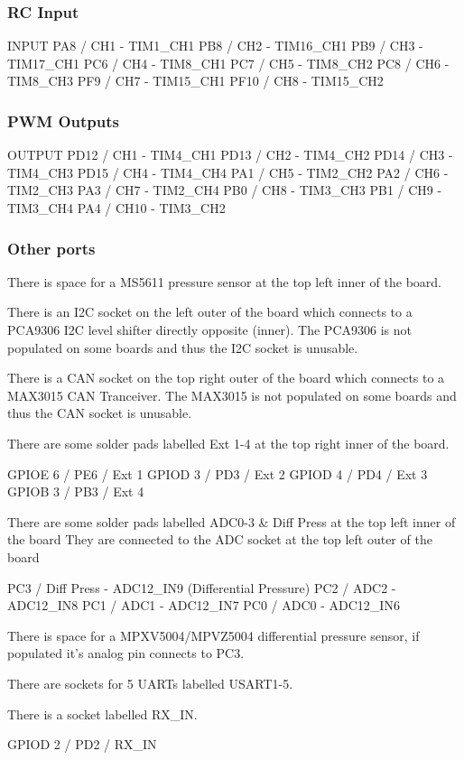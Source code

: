 \subsubsection*{R\+C Input}

I\+N\+P\+U\+T P\+A8 / C\+H1 -\/ T\+I\+M1\+\_\+\+C\+H1 P\+B8 / C\+H2 -\/ T\+I\+M16\+\_\+\+C\+H1 P\+B9 / C\+H3 -\/ T\+I\+M17\+\_\+\+C\+H1 P\+C6 / C\+H4 -\/ T\+I\+M8\+\_\+\+C\+H1 P\+C7 / C\+H5 -\/ T\+I\+M8\+\_\+\+C\+H2 P\+C8 / C\+H6 -\/ T\+I\+M8\+\_\+\+C\+H3 P\+F9 / C\+H7 -\/ T\+I\+M15\+\_\+\+C\+H1 P\+F10 / C\+H8 -\/ T\+I\+M15\+\_\+\+C\+H2

\subsubsection*{P\+W\+M Outputs}

O\+U\+T\+P\+U\+T P\+D12 / C\+H1 -\/ T\+I\+M4\+\_\+\+C\+H1 P\+D13 / C\+H2 -\/ T\+I\+M4\+\_\+\+C\+H2 P\+D14 / C\+H3 -\/ T\+I\+M4\+\_\+\+C\+H3 P\+D15 / C\+H4 -\/ T\+I\+M4\+\_\+\+C\+H4 P\+A1 / C\+H5 -\/ T\+I\+M2\+\_\+\+C\+H2 P\+A2 / C\+H6 -\/ T\+I\+M2\+\_\+\+C\+H3 P\+A3 / C\+H7 -\/ T\+I\+M2\+\_\+\+C\+H4 P\+B0 / C\+H8 -\/ T\+I\+M3\+\_\+\+C\+H3 P\+B1 / C\+H9 -\/ T\+I\+M3\+\_\+\+C\+H4 P\+A4 / C\+H10 -\/ T\+I\+M3\+\_\+\+C\+H2

\subsubsection*{Other ports}

There is space for a M\+S5611 pressure sensor at the top left inner of the board.

There is an I2\+C socket on the left outer of the board which connects to a P\+C\+A9306 I2\+C level shifter directly opposite (inner). The P\+C\+A9306 is not populated on some boards and thus the I2\+C socket is unusable.

There is a C\+A\+N socket on the top right outer of the board which connects to a M\+A\+X3015 C\+A\+N Tranceiver. The M\+A\+X3015 is not populated on some boards and thus the C\+A\+N socket is unusable.

There are some solder pads labelled Ext 1-\/4 at the top right inner of the board.

G\+P\+I\+O\+E 6 / P\+E6 / Ext 1 G\+P\+I\+O\+D 3 / P\+D3 / Ext 2 G\+P\+I\+O\+D 4 / P\+D4 / Ext 3 G\+P\+I\+O\+B 3 / P\+B3 / Ext 4

There are some solder pads labelled A\+D\+C0-\/3 \& Diff Press at the top left inner of the board They are connected to the A\+D\+C socket at the top left outer of the board

P\+C3 / Diff Press -\/ A\+D\+C12\+\_\+\+I\+N9 (Differential Pressure) P\+C2 / A\+D\+C2 -\/ A\+D\+C12\+\_\+\+I\+N8 P\+C1 / A\+D\+C1 -\/ A\+D\+C12\+\_\+\+I\+N7 P\+C0 / A\+D\+C0 -\/ A\+D\+C12\+\_\+\+I\+N6

There is space for a M\+P\+X\+V5004/\+M\+P\+V\+Z5004 differential pressure sensor, if populated it's analog pin connects to P\+C3.

There are sockets for 5 U\+A\+R\+Ts labelled U\+S\+A\+R\+T1-\/5.

There is a socket labelled R\+X\+\_\+\+I\+N.

G\+P\+I\+O\+D 2 / P\+D2 / R\+X\+\_\+\+I\+N 
